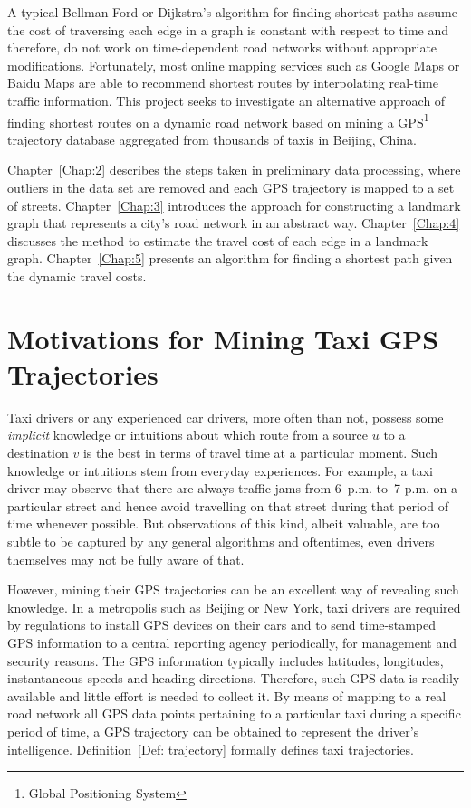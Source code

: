 A typical Bellman-Ford \cite{CLRS09} or Dijkstra's algorithm \cite{Dij59} for finding shortest paths assume the cost of traversing each edge in a graph is constant with respect to time and therefore, do not work on time-de\-pendent road networks without appropriate modifications. Fortunately, most online mapping services such as Google Maps or Baidu Maps are able to recommend shortest routes by interpolating real-time traffic information. This project seeks to investigate an alternative approach of finding shortest routes on a dynamic road network based on mining a GPS\footnote{Global Positioning System} trajectory database aggregated from thousands of taxis in Beijing, China.

Chapter~\ref{Chap:2} describes the steps taken in preliminary data processing, where outliers in the data set are removed and each GPS trajectory is mapped to a set of streets. Chapter~\ref{Chap:3} introduces the approach for constructing a landmark graph that represents a city's road network in an abstract way. Chapter~\ref{Chap:4} discusses the method to estimate the travel cost of each edge in a landmark graph. Chapter~\ref{Chap:5} presents an algorithm for finding a shortest path given the dynamic travel costs. 

\section{Motivations for Mining Taxi GPS Trajectories}
Taxi drivers or any experienced car drivers, more often than not, possess some \emph{implicit} knowledge or intuitions about which route from a source $u$ to a destination $v$ is the best in terms of travel time at a particular moment. Such knowledge or intuitions stem from everyday experiences. For example, a taxi driver may observe that there are always traffic jams from 6~p.m. to~7 p.m. on a particular street and hence avoid travelling on that street during that period of time whenever possible. But observations of this kind, albeit valuable, are too subtle to be captured by any general algorithms and oftentimes, even drivers themselves may not be fully aware of that.

However, mining their GPS trajectories can be an excellent way of revealing such knowledge. In a metropolis such as Beijing or New York, taxi drivers are required by regulations to install GPS devices on their cars and to send time-stamped GPS information to a central reporting agency periodically, for management and security reasons. The GPS information typically includes latitudes, longitudes, instantaneous speeds and heading directions. Therefore, such GPS data is readily available and little effort is needed to collect it. By means of mapping to a real road network all GPS data points pertaining to a particular taxi during a specific period of time, a GPS trajectory can be obtained to represent the driver's intelligence. Definition~\ref{Def: trajectory} formally defines taxi trajectories. 

